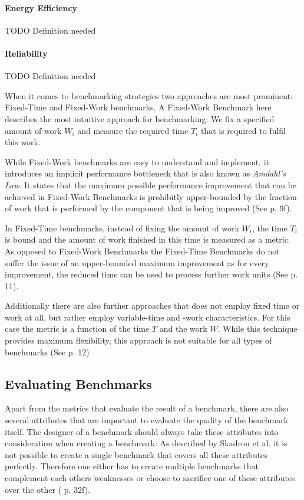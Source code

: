 \documentclass[	runningheads,
				a4paper]{llncs}
\begin{document}
\paragraph{Energy Efficiency} TODO Definition needed

\paragraph{Reliability} TODO Definition needed

When it comes to benchmarking strategies two approaches are most prominent: Fixed-Time and Fixed-Work benchmarks. A Fixed-Work Benchmark here describes the most intuitive approach for benchmarking: We fix a specified amount of work $W_i$ and measure the required time $T_i$ that is required to fulfil this work.

While Fixed-Work benchmarks are easy to understand and implement, it introduces an implicit performance bottleneck that is also known as \textit{Amdahl's Law}. It states that the maximum possible performance improvement that can be achieved in Fixed-Work Benchmarks is prohibitly upper-bounded by the fraction of work that is performed by the component that is being improved (See \cite{Kounev} p. 9f).

In Fixed-Time benchmarks, instead of fixing the amount of work $W_i$, the time $T_i$ is bound and the amount of work finished in this time is measured as a metric. As opposed to Fixed-Work Benchmarks the Fixed-Time Benchmarks do not suffer the issue of an upper-bounded maximum improvement as for every improvement, the reduced time can be used to process further work units (See \cite{Kounev} p. 11).

Additionally there are also further approaches that does not employ fixed time or work at all, but rather employ variable-time and -work characteristics. For this case the metric is a function of the time $T$ and the work $W$. While this technique provides maximum flexibility, this approach is not suitable for all types of benchmarks (See \cite{Kounev} p. 12)

\subsection{Evaluating Benchmarks}

Apart from the metrics that evaluate the result of a benchmark, there are also several attributes that are important to evaluate the quality of the benchmark itself. The designer of a benchmark should always take these attributes into consideration when creating a benchmark. As described by Skadron et al. it is not possible to create a single benchmark that covers all these attributes perfectly. Therefore one either has to create multiple benchmarks that complement each others weaknesses or choose to sacrifice one of these attributes over the other (\cite{Skadron2003} p. 32f).
\end{document}
